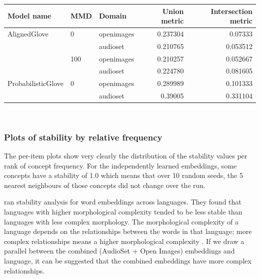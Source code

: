 \begin{tabular}{lllrr}
\toprule
Model name  & MMD    & Domain          & Union metric & Intersection metric         \\
\midrule
AlignedGlove & 0   & openimages &  0.237304 & 0.07333\\
            &     & audioset &  0.210765 & 0.053512\\
            & 100 & openimages &  0.210257 & 0.052667\\
                   &     & audioset &  0.224780 & 0.081605\\
ProbabilisticGlove & 0   & openimages &  0.289989 & 0.101333 \\
                   &     & audioset &  0.39005 & 0.331104 \\
\bottomrule
\end{tabular}\\

\subsubsection{Plots of stability by relative frequency}

The per-item plots show very clearly the distribution of the stability values per rank of concept frequency. For the independently learned embeddings, some concepts have a stability of 1.0 which means that over 10 random seeds, the 5 nearest neighbours of those concepts did not change over the run. 

\cite{WordEmbeddingStability} ran stability analysis for word embeddings across languages. They found that languages with higher morphological complexity tended to be less stable than languages with less complex morphology. The morphological complexity of a language depends on the relationships between the words in that language; more complex relationships means a higher morphological complexity . If we draw a parallel between the combined (AudioSet + Open Images) embeddings and language, it can be suggested that the combined embeddings have more complex relationships. 

